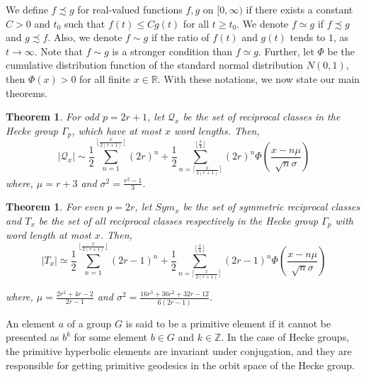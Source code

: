 \documentclass[11pt]{amsart}
\numberwithin{equation}{section}
\newtheorem{thm}[theorem]{Theorem}
\newcommand{\z}{\mathbb{Z}}
\numberwithin{equation}{section}
\begin{document}
We define $f \precsim g
$ for real-valued functions $f,g$ on $[0,\infty)$ if there exists a constant $C>0$ and $t_0$ such that $f(t)\leq Cg(t)$ for all $t\geq t_0.$
 We denote $f\simeq g $  if $f\precsim g$ and $g\precsim f$. Also, we denote $ f\sim g$ if the ratio of $f(t)$ and $g(t)$ tends to $1$, as $t\to \infty.$ Note that $f\sim g$ is a stronger condition than $f\simeq g.$
 Further, let $\Phi$ be the cumulative distribution function of the standard normal distribution $N(0,1)$, then $\Phi(x)>0$ for all finite $x\in \mathbb{R}$.  With these notations, we now state our main theorems.
	
	
		\begin{thm}\label{main1}
		For odd $p=2r+1 $, let $\mathcal{Q}_{x}$ be the set of reciprocal classes in the Hecke group $\Gamma_{p}$, which have at most $x$ word lengths. Then,
		\[|\mathcal{Q}_{x}|\sim 	\frac{1}{2}\sum_{n=1}^{\lfloor \frac{x}{2(r+1)}\rfloor}(2r)^{n}+\frac{1}{2}{\sum_{n=\lceil \frac{x}{2(r+1)}\rceil}^{\lfloor\frac{x}{4}\rfloor}(2r)^{n}\Phi\left(\frac{x-n\mu}{\sqrt{n}\sigma}\right)} \] where, $\mu=r+3$ and $\sigma^{2}=\frac{r^{2}-1}{3}.$
	\end{thm}
	
 \begin{thm}\label{main2}
	For even $p=2r $, let $Sym_x$ be the set of symmetric reciprocal classes and  $T_{x}$ be the set of  all reciprocal classes respectively in the Hecke group $\Gamma_{p}$ with word length at most $x$.  Then,
	\[|T_x|\simeq 	\frac{1}{2}\sum_{n=1}^{\lfloor \frac{x}{2(r+1)}\rfloor}(2r-1)^{n}+\frac{1}{2}{\sum_{n=\lceil \frac{x}{2(r+1)}\rceil}^{\lfloor\frac{x}{4}\rfloor}(2r-1)^{n}\Phi\left(\frac{x-n\mu}{\sqrt{n}\sigma}\right)} \] 

    where, $\mu=\frac{2r^2 + 4r - 2}{2r - 1}$ and $\sigma^{2}=\frac{16r^3 + 36r^2 + 32r - 12}{6(2r - 1)}.$
\end{thm}	\medskip

An element $a$ of a group $G$ is said to be a primitive element if it cannot be presented as $b^k$ for some element $b\in G$ and $k\in \z$. In the case of Hecke groups, the primitive hyperbolic elements are invariant under conjugation, and they are responsible for getting primitive geodesics in the orbit space of the Hecke group.
 
\end{document}
